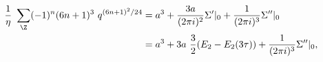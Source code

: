 \begin{equation}
  \begin{split}
    {1\over\eta}~ \sum_\Z (-1)^n (6n+1)^3 ~q^{(6n+1)^2 /24} 
    &= a^3 + {3a\over (2\pi i)^2} \Sigma'|_0 +{1\over (2\pi
      i)^3} \Sigma''|_0 \\ 
&=  a^3 + 3a~{3\over 2} (E_2 -E_2(3\tau))+{1\over (2\pi
      i)^3} \Sigma''|_0 ,
  \end{split}
\end{equation}

